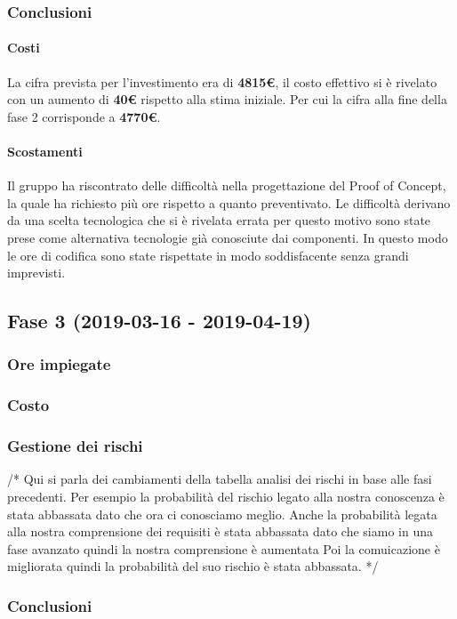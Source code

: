 	\subsubsection{Conclusioni}
		\paragraph{Costi\\}
La cifra prevista per l'investimento era di \textbf{4815€}, il costo effettivo si è rivelato con un aumento di \textbf{40€} rispetto alla stima iniziale. Per cui la cifra alla fine della fase 2 corrisponde a \textbf{4770€}.
 		
		\paragraph{Scostamenti\\}
Il gruppo ha riscontrato delle difficoltà nella progettazione del Proof of Concept, la quale ha richiesto più ore rispetto a quanto preventivato. Le difficoltà derivano da una scelta tecnologica che si è rivelata errata per questo motivo sono state prese come alternativa tecnologie già conosciute dai componenti. In questo modo le ore di codifica sono state rispettate in modo soddisfacente senza grandi imprevisti.
\newpage
\subsection{Fase 3 (2019-03-16 - 2019-04-19)}
	\subsubsection{Ore impiegate}
	\subsubsection{Costo}
	\subsubsection{Gestione dei rischi}
	/* Qui si parla dei cambiamenti della tabella analisi dei rischi in base alle fasi precedenti.
	Per esempio la probabilità del rischio legato alla nostra conoscenza è stata abbassata dato che ora ci conosciamo meglio.
	Anche la probabilità legata alla nostra comprensione dei requisiti è stata abbassata dato che siamo in una fase avanzato quindi la nostra comprensione è aumentata
	Poi la comuicazione è migliorata quindi la probabilità del suo rischio è stata abbassata. */
	\subsubsection{Conclusioni}


